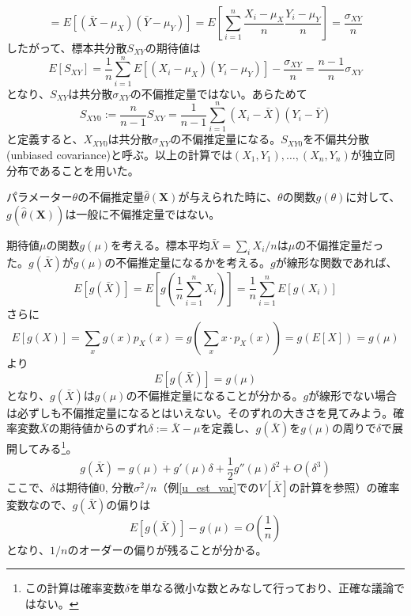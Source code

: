 \documentclass[uplatex,dvipdfmx]{jlreq}
\newcommand\term[1]{\textsf{#1}}
\begin{document}
\begin{example}[期待値が未知の場合の共分散の不偏推定量]
\begin{equation}
        = E[(\bar{X} - \mu_X)(\bar{Y} - \mu_Y)]
        = E\left[\sum_{i=1}^n\frac{X_i - \mu_X}{n}\frac{Y_i - \mu_Y}{n}\right]
        = \frac{\sigma_{XY}}{n}
    \end{equation}
    したがって、標本共分散$S_{XY}$の期待値は
    \begin{equation}
        E[S_{XY}]
        = \frac{1}{n}\sum_{i=1}^n E[(X_i - \mu_X)(Y_i - \mu_Y)] - \frac{\sigma_{XY}}{n}
        = \frac{n-1}{n}\sigma_{XY}
    \end{equation}
    となり、$S_{XY}$は共分散$\sigma_{XY}$の不偏推定量ではない。あらためて
    \begin{equation}
        S_{XY0} := \frac{n}{n-1}S_{XY}
        = \frac{1}{n-1} \sum_{i=1}^n (X_i - \bar{X})(Y_i - \bar{Y})
    \end{equation}
    と定義すると、$X_{XY0}$は共分散$\sigma_{XY}$の不偏推定量になる。$S_{XY0}$を\term{不偏共分散 (unbiased covariance)}と呼ぶ。以上の計算では$(X_1, Y_1), \dotsc, (X_n, Y_n)$が独立同分布であることを用いた。
\end{example}

パラメーター$\theta$の不偏推定量$\hat{\theta}(\boldsymbol{X})$が与えられた時に、$\theta$の関数$g(\theta)$に対して、$g(\hat{\theta}(\boldsymbol{X}))$は一般に不偏推定量ではない。

\begin{example}[期待値の関数の推定]
    期待値$\mu$の関数$g(\mu)$を考える。標本平均$\bar{X}=\sum_i X_i/n$は$\mu$の不偏推定量だった。$g(\bar{X})$が$g(\mu)$の不偏推定量になるかを考える。$g$が線形な関数であれば、
    \begin{equation}
        E[g(\bar{X})]
        = E\left[g\left(\frac{1}{n}\sum_{i=1}^n X_i\right)\right]
        = \frac{1}{n}\sum_{i=1}^n E[g(X_i)]
    \end{equation}
    さらに
    \begin{equation}
        E[g(X)] = \sum_x g(x)p_X(x)
        = g\left(\sum_x x\cdot p_X(x)\right)
        = g(E[X]) = g(\mu)
    \end{equation}
    より
    \begin{equation}
        E[g(\bar{X})] = g(\mu)
    \end{equation}
    となり、$g(\bar{X})$は$g(\mu)$の不偏推定量になることが分かる。$g$が線形でない場合は必ずしも不偏推定量になるとはいえない。そのずれの大きさを見てみよう。確率変数$\bar{X}$の期待値からのずれ$\delta := \bar{X} - \mu$を定義し、$g(\bar{X})$を$g(\mu)$の周りで$\delta$で展開してみる\footnote{この計算は確率変数$\delta$を単なる微小な数とみなして行っており、正確な議論ではない。}。
    \begin{equation}
        g(\bar{X})
        = g(\mu) + g'(\mu)\delta + \frac{1}{2}g''(\mu)\delta^2 + O(\delta^3)
    \end{equation}
    ここで、$\delta$は期待値0, 分散$\sigma^2/n$（例\ref{u_est_var}での$V[\bar{X}]$の計算を参照）の確率変数なので、$g(\bar{X})$の偏りは
    \begin{equation}
        E[g(\bar{X})] - g(\mu) = O\left(\frac{1}{n}\right)
    \end{equation}
    となり、$1/n$のオーダーの偏りが残ることが分かる。
\end{example}
\end{document}
